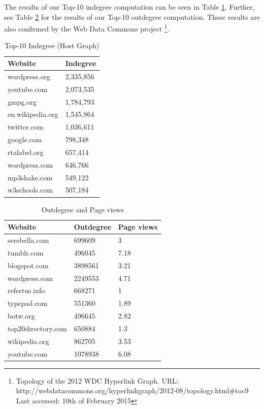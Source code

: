 The results of our Top-10 indegree computation can be seen in Table \ref{t4a}. Further, see Table \ref{t4} for the results of our Top-10 outdegree computation. These results are also confirmed by the Web Data Commons project \footnote{Topology of the 2012 WDC Hyperlink Graph. URL: http://webdatacommons.org/hyperlinkgraph/2012-08/topology.html\#toc9 Last accessed: 10th of February 2015}.

\begin{table}[H]
	\caption{Top-10 Indegree (Host Graph)}
	\label{t4a}
	\begin{center}
		\begin{tabular}{|l|l|}
			\hline
			Website	&Indegree \\ \hline
			wordpress.org	&2,335,856 \\ \hline
			youtube.com	&2,073,535 \\ \hline
			gmpg.org	&1,784,793 \\ \hline
			en.wikipedia.org	&1,545,864 \\ \hline
			twitter.com	&1,036,611 \\ \hline
			google.com	&798,348 \\ \hline
			rtalabel.org	&657,414 \\ \hline
			wordpress.com	&646,766 \\ \hline
			mp3shake.com	&549,122 \\ \hline
			w3schools.com	&507,184 \\ \hline
		\end{tabular}
	\end{center}
\end{table}

\begin{table}[H]
	\caption{Outdegree and Page views}
	\label{t4}
	\begin{center}
		\begin{tabular}{|l|l|l|}
			\hline
			Website	&Outdegree	&Page views \\ \hline
			serebella.com	&699609	&3 \\ \hline
			tumblr.com	&496045	&7.18 \\ \hline
			blogspot.com	&3898561	&3.21 \\ \hline
			wordpress.com	&2249553	&4.71 \\ \hline
			refertus.info	&668271	&1 \\ \hline
			typepad.com	&551360	&1.89 \\ \hline
			botw.org	&496645	&2.82 \\ \hline
			top20directory.com	&650884	&1.3 \\ \hline
			wikipedia.org	&862705	&3.53 \\ \hline	
			youtube.com	&1078938	&6.08 \\ \hline			
		\end{tabular}
	\end{center}
\end{table}
